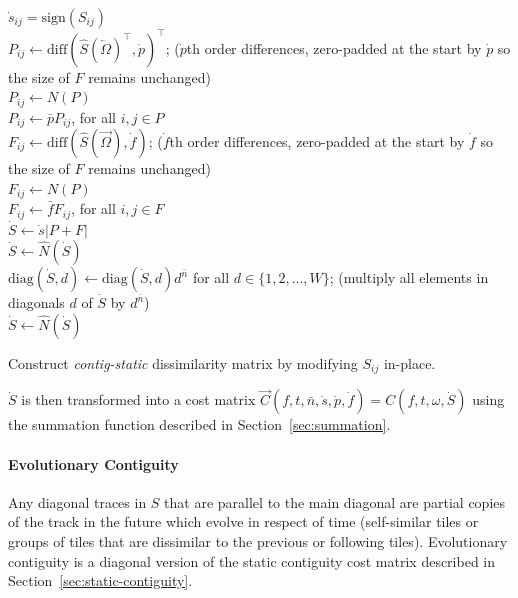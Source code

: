 \documentclass[twocolumn]{article}
\begin{document}
\begin{algorithm}
	\DontPrintSemicolon %
	$\dot s_{ij} = \mathrm{sign}(S_{ij})$ \\
	$P_{ij} \gets \mathrm{diff}( \hat S( \overleftarrow{\Omega} )^\intercal, \dot p )^\intercal$; ($\dot p$th order differences, zero-padded at the start by $\dot p$ so the size of $F$ remains unchanged) \\
	$P_{ij} \gets N( P )$ \\
	$ P_{ij} \gets  \bar p P_{ij}$, for all $i,j \in P$ \\

	$F_{ij} \gets \mathrm{diff}( \hat S( \overrightarrow{\Omega} ), \dot f )$; ($\dot f$th order differences, zero-padded at the start by $\dot f$ so the size of $F$ remains unchanged) \\
	$F_{ij} \gets N( P )$ \\
	$ F_{ij} \gets  \bar f F_{ij}$, for all $i,j \in F$ \\
	$\dot S \gets \dot s|P+F|$ \\
	$\dot S \gets \hat N(\dot S)$ \\
	
	$\mathrm{diag}( \dot S, d ) \gets \mathrm{diag}( \dot S, d ) d^{\bar n}$ for all $d \in \{1,2,\ldots,W\}$; (multiply all elements in diagonals $d$ of $\dot S$ by $d^{\bar n}$) \\
	$\dot S \gets \hat N(\dot S)$ \\

	\;
	\caption{Construct \textit{contig-static} dissimilarity matrix by modifying $S_{ij}$ in-place.}
	\label{algo:contig}
\end{algorithm}
	
$\dot S$ is then transformed into a cost matrix $\vec{C}(f,t,\bar n,\dot s,\dot p,\dot f) = C(f,t, \omega, \dot S)$ using the summation function described in Section~\ref{sec:summation}.

\paragraph{Evolutionary Contiguity}

Any diagonal traces in $S$ that are parallel to the main diagonal are partial copies of the track in the future which evolve in respect of time (self-similar tiles or groups of tiles that are dissimilar to the previous or following tiles). Evolutionary contiguity is a diagonal version of the static contiguity cost matrix described in Section~\ref{sec:static-contiguity}.
\end{document}
